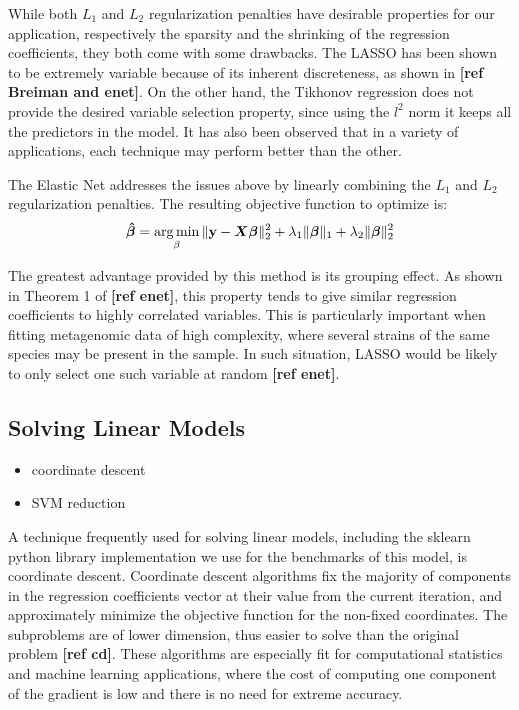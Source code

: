 While both $L_1$ and $L_2$ regularization penalties have desirable properties for our application, respectively the sparsity and the shrinking of the regression coefficients, they both come with some drawbacks. The LASSO has been shown to be extremely variable because of its inherent discreteness, as shown in \textbf{[ref Breiman and enet]}. On the other hand, the Tikhonov regression does not provide the desired variable selection property, since using the $l^2$ norm it keeps all the predictors in the model. It has also been observed that in a variety of applications, each technique may perform better than the other.

The Elastic Net addresses the issues above by linearly combining the $L_1$ and $L_2$ regularization penalties. The resulting objective function to optimize is:
\begin{equation*}
    \boldsymbol{\hat{\beta}} = \operatorname*{arg\,min}_{\beta}{\lVert\mathbf{y} - \boldsymbol{X}\boldsymbol{\beta}\rVert_2^2} + \lambda_1 \lVert\boldsymbol{\beta}\rVert_1 + \lambda_2\lVert\boldsymbol{\beta}\rVert_2^2
\end{equation*}

The greatest advantage provided by this method is its grouping effect. As shown in Theorem 1 of \textbf{[ref enet]}, this property tends to give similar regression coefficients to highly correlated variables. This is particularly important when fitting metagenomic data of high complexity, where several strains of the same species may be present in the sample. In such situation, LASSO would be likely to only select one such variable at random \textbf{[ref enet]}.

\subsection{Solving Linear Models}
\begin{itemize}
    \item coordinate descent
    \item SVM reduction
\end{itemize}
A technique frequently used for solving linear models, including the sklearn python library implementation we use for the benchmarks of this model, is coordinate descent. Coordinate descent algorithms fix the majority of components in the regression coefficients vector at their value from the current iteration, and approximately minimize the objective function for the non-fixed coordinates. The subproblems are of lower dimension, thus easier to solve than the original problem \textbf{[ref cd]}. These algorithms are especially fit for computational statistics and machine learning applications, where the cost of computing one component of the gradient is low and there is no need for extreme accuracy.

